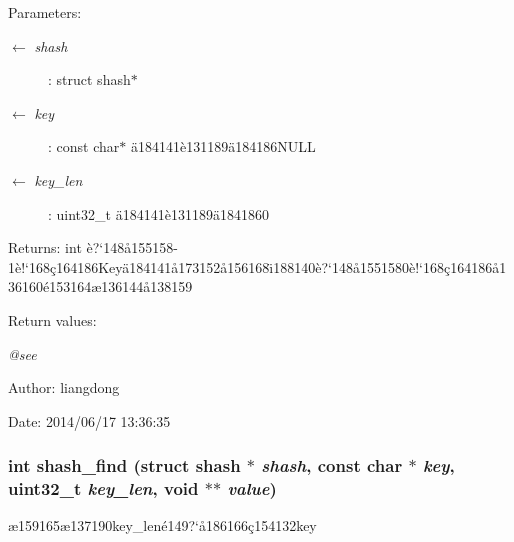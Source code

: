 \begin{Desc}
\item[Parameters:]
\begin{description}
\item[\mbox{$\leftarrow$} {\em shash}]: struct shash$\ast$ \item[\mbox{$\leftarrow$} {\em key}]: const char$\ast$ \"{a}184141\`{e}131189\"{a}184186NULL \item[\mbox{$\leftarrow$} {\em key\_\-len}]: uint32\_\-t \"{a}184141\`{e}131189\"{a}1841860 \end{description}
\end{Desc}
\begin{Desc}
\item[Returns:]int \`{e}?`148\aa{}155158-1\`{e}!`168\c{c}164186Key\"{a}184141\aa{}173152\aa{}156168\"{\i}188140\`{e}?`148\aa{}1551580\`{e}!`168\c{c}164186\aa{}136160\'{e}153164\ae{}136144\aa{}138159 \end{Desc}
\begin{Desc}
\item[Return values:]
\begin{description}
\item[{\em @see}]\end{description}
\end{Desc}
\begin{Desc}
\item[Author:]liangdong \end{Desc}
\begin{Desc}
\item[Date:]2014/06/17 13:36:35 \end{Desc}
\subsubsection{\setlength{\rightskip}{0pt plus 5cm}int shash\_\-find (struct shash $\ast$ {\em shash}, const char $\ast$ {\em key}, uint32\_\-t {\em key\_\-len}, void $\ast$$\ast$ {\em value})}\label{shash_8c_a10}


\ae{}159165\ae{}137190key\_\-len\'{e}149?`\aa{}186166\c{c}154132key 

